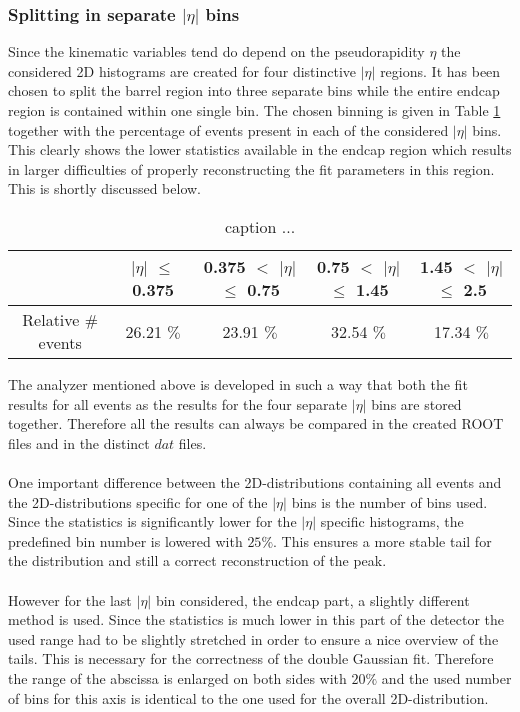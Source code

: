 \subsubsection{Splitting in separate $\vert \eta \vert$ bins}
Since the kinematic variables tend do depend on the pseudorapidity $\eta$ the considered 2D histograms are created for four distinctive $\vert \eta \vert$ regions. It has been chosen to split the barrel region into three separate bins while the entire endcap region is contained within one single bin. The chosen binning is given in Table \ref{table::EtaBins} together with the percentage of events present in each of the considered $\vert \eta \vert$ bins. This clearly shows the lower statistics available in the endcap region which results in larger difficulties of properly reconstructing the fit parameters in this region. This is shortly discussed below.
\begin{table}[h!]
 \centering
 \begin{tabular}{|c|c|c|c|c|}
  \hline
			 & $\vert\eta\vert$ $\leq$ 0.375	& 0.375 $<$ $\vert\eta\vert$ $\leq$ 0.75	& 0.75 $<$ $\vert\eta\vert$ $\leq$ 1.45	& 1.45 $<$ $\vert\eta\vert$ $\leq$ 2.5	\\
  \hline
    Relative $\#$ events &  26.21 $\%$				& 23.91 $\%$					&	32.54 $\%$			& 	17.34 $\%$			\\
  \hline
 \end{tabular} 
 \caption{caption ... } \label{table::EtaBins}
\end{table}

The analyzer mentioned above is developed in such a way that both the fit results for all events as the results for the four separate $\vert \eta \vert$ bins are stored together. Therefore all the results can always be compared in the created ROOT files and in the distinct $dat$ files.\\
\\
One important difference between the 2D-distributions containing all events and the 2D-distributions specific for one of the $\vert \eta \vert$ bins is the number of bins used. Since the statistics is significantly lower for the $\vert \eta \vert$ specific histograms, the predefined bin number is lowered with $25 \%$. This ensures a more stable tail for the distribution and still a correct reconstruction of the peak.\\
\\
However for the last $\vert \eta \vert$ bin considered, the endcap part, a slightly different method is used. Since the statistics is much lower in this part of the detector the used range had to be slightly stretched in order to ensure a nice overview of the tails. This is necessary for the correctness of the double Gaussian fit. Therefore the range of the abscissa is enlarged on both sides with $20 \%$ and the used number of bins for this axis is identical to the one used for the overall 2D-distribution.

